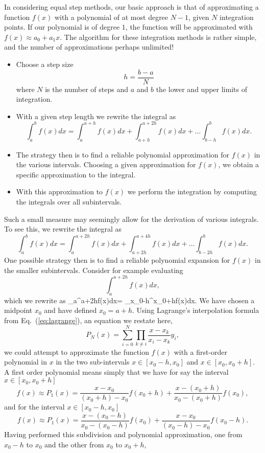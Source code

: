 In considering equal step  methods, our basic approach is that of approximating
a function $f(x)$ with a polynomial of at most 
degree $N-1$, given $N$ integration points. If our polynomial is of degree $1$,
the function will be approximated with $f(x)\approx a_0+a_1x$. 
The algorithm for these integration methods 
is rather simple, and the number of approximations perhaps 
unlimited!
\begin{itemize}
   \item Choose a step size 
    \[ 
        h=\frac{b-a}{N}
    \]
   where $N$ is the number of steps and $a$ and $b$ the lower and upper limits
   of integration. 
\item With a given step length we rewrite the integral as
\[
    \int_a^bf(x) dx= \int_a^{a+h}f(x)dx + \int_{a+h}^{a+2h}f(x)dx+\dots \int_{b-h}^{b}f(x)dx.
\]
   \item 
The strategy then is to find a reliable polynomial approximation  
for $f(x)$ in the various intervals.  Choosing a given approximation for 
$f(x)$, we obtain a specific approximation to the 
integral.
   \item With this approximation to $f(x)$ we perform the integration by computing the integrals over all subintervals.
\end{itemize}
Such a small measure may seemingly allow for the derivation of various integrals.
To see this,  we rewrite the integral as
\[
    \int_a^bf(x) dx= \int_a^{a+2h}f(x)dx + \int_{a+2h}^{a+4h}f(x)dx+\dots \int_{b-2h}^{b}f(x)dx.
\]
One possible strategy then is to find a reliable polynomial expansion for $f(x)$ in the smaller
subintervals. Consider for example evaluating 
\[
   \int_a^{a+2h}f(x)dx, 
\]
which we rewrite as
\be
   \int_a^{a+2h}f(x)dx=
 \int_{x_0-h}^{x_0+h}f(x)dx.
     \label{eq:hhint}
\ee
We have chosen a midpoint $x_0$ and have defined $x_0=a+h$.
Using Lagrange's interpolation formula from Eq.~(\ref{eq:lagrange}), an equation we restate here,
\[
   P_N(x)=\sum_{i=0}^{N}\prod_{k\ne i} \frac{x-x_k}{x_i-x_k}y_i,
\]
we could attempt to approximate the function $f(x)$ with a first-order polynomial in $x$ in the two
sub-intervals $x\in[x_0-h,x_0]$ and $x\in[x_0,x_0+h]$. A first order polynomial means simply that 
we have for say the interval  $x\in[x_0,x_0+h]$
\[
   f(x)\approx P_1(x)=\frac{x-x_0}{(x_0+h)-x_0}f(x_0+h)+\frac{x-(x_0+h)}{x_0-(x_0+h)}f(x_0),
\]
and for the interval  $x\in[x_0-h,x_0]$
\[
   f(x)\approx P_1(x)=\frac{x-(x_0-h)}{x_0-(x_0-h)}f(x_0)+\frac{x-x_0}{(x_0-h)-x_0}f(x_0-h).
\]
Having performed this subdivision and polynomial approximation,
one from $x_0-h$ to $x_0$ and the other from $x_0$ to $x_0+h$,

